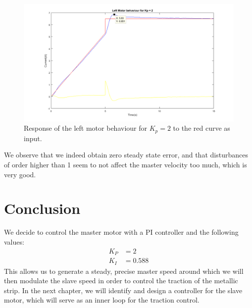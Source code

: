 \begin{figure}[htbp]
\centering
\includegraphics[width = \textwidth]{pics/LM_KP200.png}
\caption{Response of the left motor behaviour for $K_p = 2$ to the red curve as input.}
\label{fig:LM_KP200}
\end{figure}

We observe that we indeed obtain zero steady state error, and that disturbances of order higher than 1 seem to not affect the master velocity too much, which is very good.
\section{Conclusion}
We decide to control the master motor with a PI controller and the following values:
\begin{align*}
	K_P &= 2 \\
	K_I &= 0.588
\end{align*}
This allows us to generate a steady, precise master speed around which we will then modulate the slave speed in order to control the traction of the metallic strip. In the next chapter, we will identify and design a controller for the slave motor, which will serve as an inner loop for the traction control.
